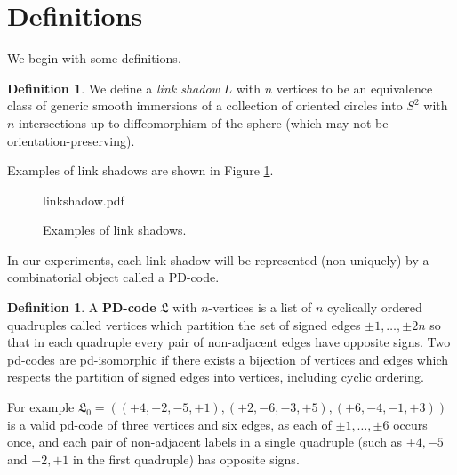 \documentclass[amsmath,secnumarabic,floatfix,amssymb,nofootinbib,nobibnotes,letterpaper,11pt,tightenlines,showkeys]{revtex4}
\theoremstyle{definition}
\newtheorem{definition}[theorem]{Definition}
\let\mgp=\marginpar \marginparwidth18mm \marginparsep1mm
\def\marginpar#1{\mgp{\raggedright\tiny #1}}
\let\lbl=\label
\def\label#1{\lbl{#1}\ifinner\else\marginpar{\ref{#1} #1}\ignorespaces\fi}
\begin{document}
\section{Definitions}

We begin with some definitions.
\begin{definition}
We define a \emph{link shadow} $L$ with $n$ vertices to be an equivalence class of generic smooth immersions of a collection of oriented circles into $S^2$ with $n$ intersections up to diffeomorphism of the sphere (which may not be orientation-preserving).
\end{definition}
Examples of link shadows are shown in Figure \ref{fig:ShadowExamples}.
\begin{figure}
	\begin{overpic}[width=4in]{linkshadow.pdf}
	\end{overpic}
	\caption{\label{fig:ShadowExamples}Examples of link shadows.}
\end{figure}
In our experiments, each link shadow will be represented (non-uniquely) by a combinatorial object called a PD-code. 
\begin{definition}\label{def:PD}
A \textbf{PD-code} $\mathfrak{L}$ with $n$-vertices is a list of $n$ cyclically ordered quadruples called vertices which partition the set of signed edges $\pm 1,\dots, \pm 2n$ so that in each quadruple every pair of non-adjacent edges have opposite signs. Two pd-codes are pd-isomorphic if there exists a bijection of vertices and edges which respects the partition of signed edges into vertices, including cyclic ordering.
\end{definition}
For example $\mathfrak{L}_0 = ((+4,-2,-5,+1),(+2,-6,-3,+5),(+6,-4,-1,+3))$ is a valid pd-code of three vertices and six edges, as each of $\pm 1, \dots, \pm 6$ occurs once, and each pair of non-adjacent labels in a single quadruple (such as $+4,-5$ and $-2,+1$ in the first quadruple) has opposite signs. 
\end{document}
